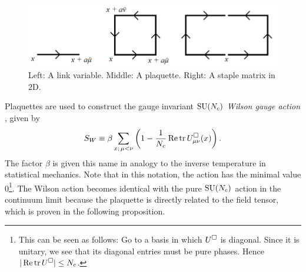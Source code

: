 \begin{figure}[t]
  \centering
  \includegraphics[width=0.9\linewidth]{figs/links.png}
  \caption{Left: A link variable. Middle: A plaquette. 
           Right: A staple matrix in 2D.}
  \label{fig:links}
\end{figure}

Plaquettes are used to construct the gauge invariant $\operatorname{SU}(N_c)$ {\it Wilson
gauge action} \cite{wilson_confinement_1974}, given by
\begin{equation}\label{eq:wilsonaction}\index{Wilson!gauge action}\index{action!Wilson gauge}
    S_W\equiv\beta\sum\limits_{x;\,\mu<\nu}\left(1
         -\frac{1}{N_c}\Re\tr \plaq_{\mu\nu}(x)\right).
\end{equation}
The factor $\beta$ is given this name in analogy to the inverse temperature 
in statistical mechanics. Note that in this notation, the action has the
minimal value 0\footnote{This can be seen as follows: Go to a basis in which
$U^\square$ is diagonal. Since it is unitary, we see that its diagonal
entries must be pure phases. Hence $|\mathop{\mathrm{Re}}\tr U^\square|\leq N_c$.}. 
The Wilson action becomes identical with the
pure $\operatorname{SU}(N_c)$ action in the continuum limit because the plaquette is
directly related to the field tensor, which is proven in the following
proposition. 
